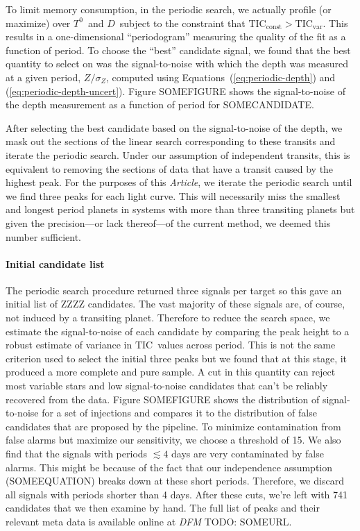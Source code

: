 \documentclass[12pt,preprint]{aastex}
\newcommand{\paper}{\textsl{Article}}
\newcommand{\TIC}{{\ensuremath{\mathrm{TIC}}}}
\newcommand{\todo}[3]{{\color{#2} \emph{#1} TODO: #3}}
\newcommand{\dfmtodo}[1]{\todo{DFM}{red}{#1}}
\newcommand{\phase}{{\ensuremath{T^0}}}
\newcommand{\duration}{{\ensuremath{D}}}
\newcommand{\depth}{{\ensuremath{Z}}}
\begin{document}
To limit memory consumption, in the periodic search, we actually profile (or
maximize) over \phase\ and \duration\ subject to the constraint that
$\TIC_\mathrm{const} > \TIC_\mathrm{var}$.
This results in a one-dimensional ``periodogram'' measuring the quality of
the fit as a function of period.
To choose the ``best'' candidate signal, we found that the best quantity to
select on was the signal-to-noise with which the depth was measured at a
given period, $\depth/\sigma_\depth$, computed using
Equations~(\ref{eq:periodic-depth}) and (\ref{eq:periodic-depth-uncert}).
Figure SOMEFIGURE shows the signal-to-noise of the depth measurement as a
function of period for SOMECANDIDATE.

After selecting the best candidate based on the signal-to-noise of the depth,
we mask out the sections of the linear search corresponding to these transits
and iterate the periodic search.
Under our assumption of independent transits, this is equivalent to removing
the sections of data that have a transit caused by the highest peak.
For the purposes of this \paper, we iterate the periodic search until we find
three peaks for each light curve.
This will necessarily miss the smallest and longest period planets in systems
with more than three transiting planets but given the precision---or lack
thereof---of the current method, we deemed this number sufficient.


\paragraph{Initial candidate list}

The periodic search procedure returned three signals per target so this gave
an initial list of ZZZZ candidates.
The vast majority of these signals are, of course, not induced by a
transiting planet.
Therefore to reduce the search space, we estimate the signal-to-noise of each
candidate by comparing the peak height to a robust estimate of variance in
\TIC\ values across period.
This is not the same criterion used to select the initial three peaks but we
found that at this stage, it produced a more complete and pure sample.
A cut in this quantity can reject most variable stars and low signal-to-noise
candidates that can't be reliably recovered from the data.
Figure SOMEFIGURE shows the distribution of signal-to-noise for a set of
injections and compares it to the distribution of false candidates that are
proposed by the pipeline.
To minimize contamination from false alarms but maximize our sensitivity, we
choose a threshold of 15.
We also find that the signals with periods $\lesssim 4$ days are very
contaminated by false alarms.
This might be because of the fact that our independence assumption
(SOMEEQUATION) breaks down at these short periods.
Therefore, we discard all signals with periods shorter than 4 days.
After these cuts, we're left with 741 candidates that we then examine by hand.
The full list of peaks and their relevant meta data is available online at
\dfmtodo{SOMEURL}.
\end{document}
